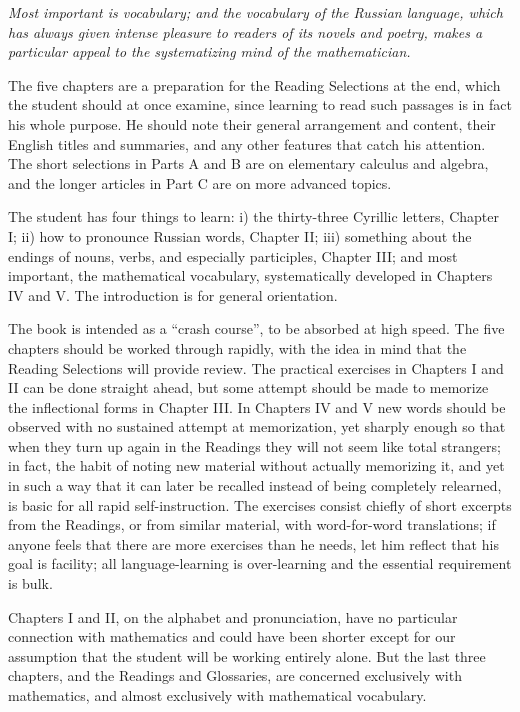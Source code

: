 \begin{sourcebox}
\centering\itshape
Most important is vocabulary; and the vocabulary of the Russian language, which has always given intense pleasure to readers of its novels and poetry, makes a particular appeal to the systematizing mind of the mathematician.
\end{sourcebox}


The five chapters are a preparation for the Reading Selections at the end, which the student should at once examine, since learning to read such passages is in fact his whole purpose. He should note their general arrangement and content, their English titles and summaries, and any other features that catch his attention. The short selections in Parts A and B are on elementary calculus and algebra, and the longer articles in Part C are on more advanced topics.

The student has four things to learn: i) the thirty-three Cyrillic letters, Chapter I; ii) how to pronounce Russian words, Chapter II; iii) something about the endings of nouns, verbs, and especially participles, Chapter III; and most important, the mathematical vocabulary, systematically developed in Chapters IV and V. The introduction is for general orientation.

The book is intended as a ``crash course'', to be absorbed at high speed. The five chapters should be worked through rapidly, with the idea in mind that the Reading Selections will provide review. The practical exercises in Chapters I and II can be done straight ahead, but some attempt should be made to memorize the inflectional forms in Chapter III. In Chapters IV and V new words should be observed with no sustained attempt at memorization, yet sharply enough so that when they turn up again in the Readings they will not seem like total strangers; in fact, the habit of noting new material without actually memorizing it, and yet in such a way that it can later be recalled instead of being completely relearned, is basic for all rapid self-instruction. The exercises consist chiefly of short excerpts from the Readings, or from similar material, with word-for-word translations; if anyone feels that there are more exercises than he needs, let him reflect that his goal is facility; all language-learning is over-learning and the essential requirement is bulk.

Chapters I and II, on the alphabet and pronunciation, have no particular connection with mathematics and could have been shorter except for our assumption that the student will be working entirely alone. But the last three chapters, and the Readings and Glossaries, are concerned exclusively with mathematics, and almost exclusively with mathematical vocabulary.

